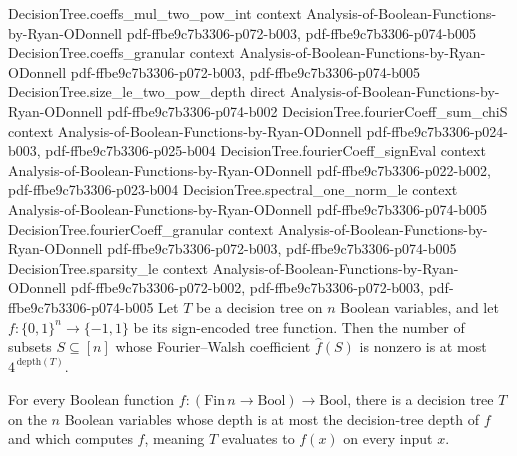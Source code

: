 \begin{theorem}
\proofstep
  {DecisionTree.coeffs_mul_two_pow_int}
  {context}
  {Analysis-of-Boolean-Functions-by-Ryan-ODonnell}
  {pdf-ffbe9c7b3306-p072-b003,
    pdf-ffbe9c7b3306-p074-b005}
\proofstep
  {DecisionTree.coeffs_granular}
  {context}
  {Analysis-of-Boolean-Functions-by-Ryan-ODonnell}
  {pdf-ffbe9c7b3306-p072-b003,
    pdf-ffbe9c7b3306-p074-b005}
\proofstep
  {DecisionTree.size_le_two_pow_depth}
  {direct}
  {Analysis-of-Boolean-Functions-by-Ryan-ODonnell}
  {pdf-ffbe9c7b3306-p074-b002}
\proofstep
  {DecisionTree.fourierCoeff_sum_chiS}
  {context}
  {Analysis-of-Boolean-Functions-by-Ryan-ODonnell}
  {pdf-ffbe9c7b3306-p024-b003,
    pdf-ffbe9c7b3306-p025-b004}
\proofstep
  {DecisionTree.fourierCoeff_signEval}
  {context}
  {Analysis-of-Boolean-Functions-by-Ryan-ODonnell}
  {pdf-ffbe9c7b3306-p022-b002,
    pdf-ffbe9c7b3306-p023-b004}
\proofstep
  {DecisionTree.spectral_one_norm_le}
  {context}
  {Analysis-of-Boolean-Functions-by-Ryan-ODonnell}
  {pdf-ffbe9c7b3306-p074-b005}
\proofstep
  {DecisionTree.fourierCoeff_granular}
  {context}
  {Analysis-of-Boolean-Functions-by-Ryan-ODonnell}
  {pdf-ffbe9c7b3306-p072-b003,
    pdf-ffbe9c7b3306-p074-b005}
\proofstep
  {DecisionTree.sparsity_le}
  {context}
  {Analysis-of-Boolean-Functions-by-Ryan-ODonnell}
  {pdf-ffbe9c7b3306-p072-b002,
    pdf-ffbe9c7b3306-p072-b003,
    pdf-ffbe9c7b3306-p074-b005}
Let $T$ be a decision tree on $n$ Boolean variables, and let
$f\colon\{0,1\}^n\to\{-1,1\}$ be its sign-encoded tree function. Then the number of
subsets $S\subseteq[n]$ whose Fourier--Walsh coefficient $\hat f(S)$ is nonzero is at
most $4^{\,\mathrm{depth}(T)}$.
\end{theorem}

\begin{lemma}
\label{DecisionTree.exists_dtree_of_dtDepth}
\leanok
{}
For every Boolean function $f : (\mathrm{Fin}\,n \to \mathrm{Bool}) \to \mathrm{Bool}$,
there is a decision tree $T$ on the $n$ Boolean variables whose depth is at most the
decision-tree depth of $f$ and which computes $f$, meaning $T$ evaluates to $f(x)$ on
every input $x$.
\end{lemma}


